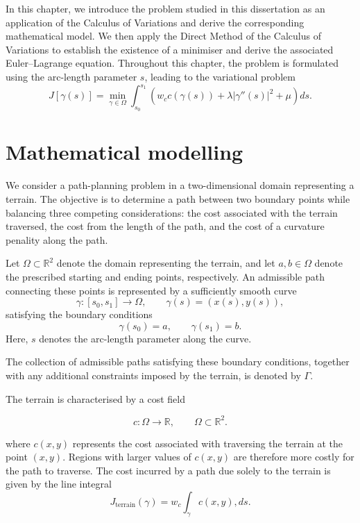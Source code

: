 In this chapter, we introduce the problem studied in this dissertation as an application of the Calculus of Variations and derive the corresponding mathematical model. We then apply the Direct Method of the Calculus of Variations to establish the existence of a minimiser and derive the associated Euler--Lagrange equation. Throughout this chapter, the problem is formulated using the arc-length parameter $s$, leading to the variational problem
\begin{equation}
\label{eq:ModelPrblem_s}
\tag{P}
J[\gamma(s)]
=
\underset{\gamma \in \Omega}{\min} \int_{s_0}^{s_1}
\left(
w_c c(\gamma(s))
+
\lambda |\gamma''(s)|^2
+
\mu
\right) ds.
\end{equation}

\section{Mathematical modelling}
\label{sec:problem_formulation}

We consider a path-planning problem in a two-dimensional domain
representing a terrain. The objective is to determine a path between two
boundary points while balancing three competing considerations: the
cost associated with the terrain traversed, the cost from the length of the
path, and the cost of a curvature penality along the path.

Let $\Omega\subset\mathbb{R}^2$ denote the domain representing the
terrain, and let $a,b\in\Omega$ denote the prescribed starting and
ending points, respectively. An admissible path connecting these
points is represented by a sufficiently smooth curve
\[
\gamma:[s_0,s_1]\rightarrow\Omega,
\qquad
\gamma(s)=(x(s),y(s)),
\]
satisfying the boundary conditions
\[
\gamma(s_0)=a,
\qquad
\gamma(s_1)=b.
\]
Here, $s$ denotes the arc-length parameter along the curve.

The collection of admissible paths satisfying these boundary
conditions, together with any additional constraints imposed by the
terrain, is denoted by $\Gamma$.

The terrain is characterised by a cost field

$$
c:\Omega\rightarrow\mathbb{R}, \qquad \Omega \subset \mathbb{R}^2.
$$

where $c(x,y)$ represents the cost associated with traversing the
terrain at the point $(x,y)$. Regions with larger values of $c(x,y)$
are therefore more costly for the path to traverse. The cost incurred
by a path due solely to the terrain is given by the line integral
\begin{equation}
J_{\mathrm{terrain}}(\gamma) = 
w_c\int_\gamma c(x,y),ds.
\label{eq:terrain_functional}
\end{equation}

